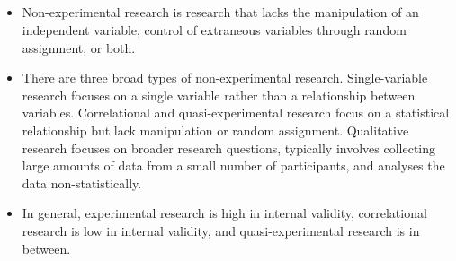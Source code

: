 \subsection{}
\begin{fullwidth}
\begin{itemize}

\item Non-experimental research is research that lacks the manipulation of an independent variable, control of extraneous variables through random assignment, or both.

\item There are three broad types of non-experimental research. Single-variable research focuses on a single variable rather than a relationship between variables. Correlational and quasi-experimental research focus on a statistical relationship but lack manipulation or random assignment. Qualitative research focuses on broader research questions, typically involves collecting large amounts of data from a small number of participants, and analyses the data non-statistically.

\item In general, experimental research is high in internal validity, correlational research is low in internal validity, and quasi-experimental research is in between.

\end{itemize}
\end{fullwidth}


